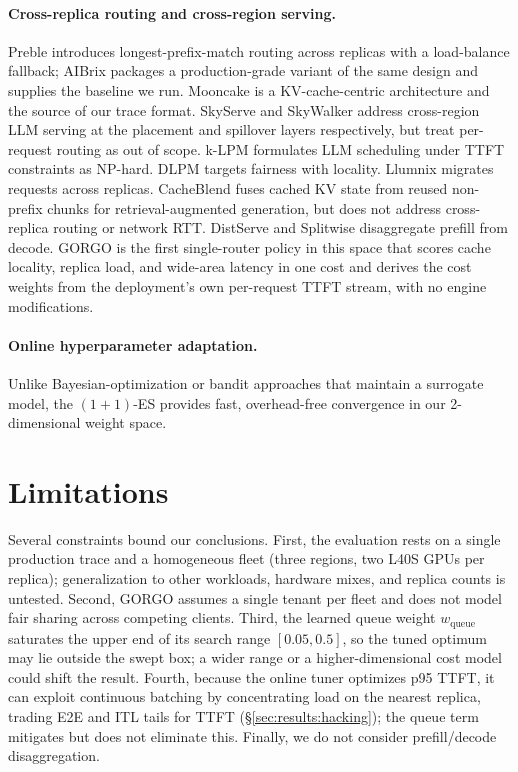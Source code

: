 \documentclass{article}
\begin{document}
\paragraph{Cross-replica routing and cross-region serving.}
Preble \citep{preble} introduces longest-prefix-match routing across replicas
with a load-balance fallback; AIBrix \citep{aibrix2024} packages a
production-grade variant of the same design and supplies the baseline we run.
Mooncake \citep{qin2024mooncake} is a KV-cache-centric architecture and the
source of our trace format. SkyServe \citep{skyserve} and SkyWalker
\citep{skywalker} address cross-region LLM serving at the placement and
spillover layers respectively, but treat per-request routing as out of scope.
k-LPM \citep{klpm2025} formulates LLM scheduling under TTFT constraints as
NP-hard. DLPM \citep{dlpm2025} targets fairness with locality. Llumnix
\citep{llumnix2024} migrates requests across replicas. CacheBlend
\citep{yao2024cacheblend} fuses cached KV state from reused non-prefix chunks
for retrieval-augmented generation, but does not address cross-replica routing
or network RTT. DistServe \citep{distserve2024} and Splitwise
\citep{splitwise2024} disaggregate prefill from decode. GORGO is the first
single-router policy in this space that scores cache locality, replica load,
and wide-area latency in one cost and derives the cost weights from the
deployment's own per-request TTFT stream, with no engine modifications.

\paragraph{Online hyperparameter adaptation.}
Unlike Bayesian-optimization or bandit approaches that maintain a surrogate
model, the $(1{+}1)$-ES \citep{rechenberg1973} provides fast, overhead-free
convergence in our 2-dimensional weight space.

\section{Limitations}
\label{sec:limitations}

Several constraints bound our conclusions. First, the evaluation rests on a
single production trace and a homogeneous fleet (three regions, two L40S GPUs
per replica); generalization to other workloads, hardware mixes, and replica
counts is untested. Second, GORGO assumes a single tenant per fleet and does not
model fair sharing across competing clients. Third, the learned queue weight
$w_{\mathrm{queue}}$ saturates the upper end of its search range $[0.05, 0.5]$,
so the tuned optimum may lie outside the swept box; a wider range or a
higher-dimensional cost model could shift the result. Fourth, because the online
tuner optimizes p95 TTFT, it can exploit continuous batching by concentrating
load on the nearest replica, trading E2E and ITL tails for TTFT
(\S\ref{sec:results:hacking}); the queue term mitigates but does not eliminate
this. Finally, we do not consider prefill/decode disaggregation.
\end{document}
